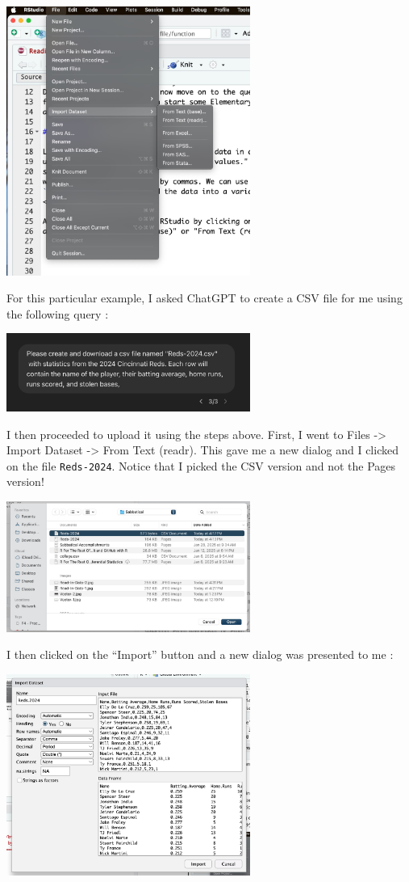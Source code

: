 \documentclass[
  letterpaper,
  DIV=11,
  numbers=noendperiod]{scrreprt}
\begin{document}
\includegraphics[width=0.6\textwidth,height=\textheight]{./images/Read-In-Data-1.jpg}

For this particular example, I asked ChatGPT to create a CSV file for me
using the following query :

\includegraphics[width=0.6\textwidth,height=\textheight]{./images/Read-In-Data-6.jpg}

I then proceeded to upload it using the steps above. First, I went to
Files -\textgreater{} Import Dataset -\textgreater{} From Text (readr).
This gave me a new dialog and I clicked on the file \texttt{Reds-2024}.
Notice that I picked the CSV version and not the Pages version!

\includegraphics[width=0.6\textwidth,height=\textheight]{./images/Read-In-Data-3.jpg}

I then clicked on the ``Import'' button and a new dialog was presented
to me :

\includegraphics[width=0.6\textwidth,height=\textheight]{./images/Read-In-Data-4.jpg}
\end{document}

